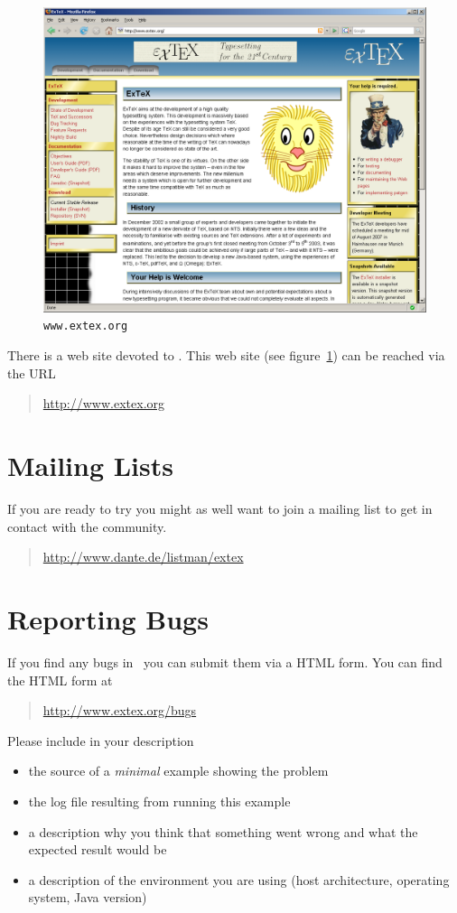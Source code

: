 \begin{figure}[!ht]
  \centering
  \includegraphics[width=.5\textwidth]{img/www-extex-org}
  \caption{\texttt{www.extex.org}}
  \label{fig:www.exetex.org}
\end{figure}
There is a web site devoted to \ExTeX. This
web site (see figure~\ref{fig:www.exetex.org}) can be reached via the
URL
\begin{quotation}
  \url{http://www.extex.org}
\end{quotation}


\section{Mailing Lists}

If you are ready to try \ExBib{} you might as well want to join a
mailing list to get in contact with the community.

\begin{quotation}
  \url{http://www.dante.de/listman/extex}
\end{quotation}


\section{Reporting Bugs}


If you find any bugs in \ExBib\ you can submit them 
via a HTML form.
You can find the HTML form at
\begin{quotation}
  \url{http://www.extex.org/bugs}
\end{quotation}

Please include in your description 
\begin{itemize}
\item the source of a \emph{minimal} example showing the problem
\item the log file resulting from running this example
\item a description why you think that something went wrong and what
  the expected result would be
\item a description of the environment you are using (host
  architecture, operating system, Java version)
\end{itemize}

\endinput
%

